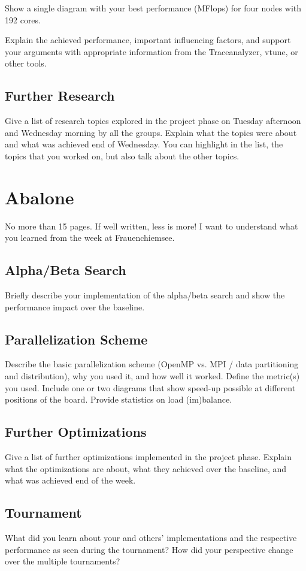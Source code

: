 \documentclass[A4]{article}
\begin{document}
Show a single diagram with your best performance (MFlops) for four nodes with 192 cores. 

Explain the achieved performance, important influencing factors, and support your arguments with appropriate information from the Traceanalyzer, vtune, or other tools. 

\subsection{Further Research}

Give a list of research topics explored in the project phase on Tuesday afternoon and Wednesday morning by all the groups. Explain what the topics were about and what was achieved end of Wednesday. You can highlight in the list, the topics that you worked on, but also talk about the other topics. 

\section{Abalone}

No more than 15 pages. If well written, less is more! I want to understand what you learned from the week at Frauenchiemsee.


\subsection{Alpha/Beta Search}

Briefly describe your implementation of the alpha/beta search and show the performance impact over the baseline.


\subsection{Parallelization Scheme}

Describe the basic parallelization scheme (OpenMP vs. MPI / data partitioning and distribution), why you used it, and how well it worked. Define the metric(s) you used. Include one or two diagrams that show speed-up possible at different positions of the board. Provide statistics on load (im)balance.


\subsection{Further Optimizations}

Give a list of further optimizations implemented in the project phase. Explain what the optimizations are about, what they achieved over the baseline, and what was achieved end of the week.


\subsection{Tournament}

What did you learn about your and others' implementations and the respective performance as seen during the tournament? How did your perspective change over the multiple tournaments?
\end{document}
